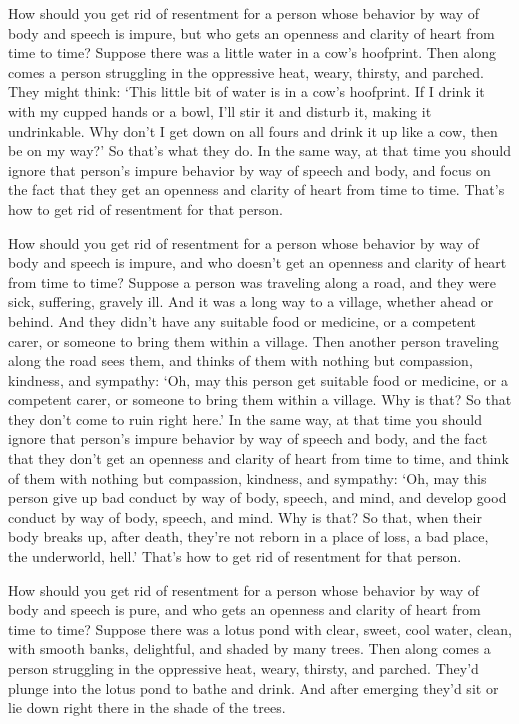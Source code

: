 \documentclass[12pt,openany]{book}%
\begin{document}
How should you get rid of resentment for a person whose behavior by way of body and speech is impure, but who gets an openness and clarity of heart from time to time? Suppose there was a little water in a cow’s hoofprint. Then along comes a person struggling in the oppressive heat, weary, thirsty, and parched. They might think: ‘This little bit of water is in a cow’s hoofprint. If I drink it with my cupped hands or a bowl, I’ll stir it and disturb it, making it undrinkable. Why don’t I get down on all fours and drink it up like a cow, then be on my way?’ So that’s what they do. In the same way, at that time you should ignore that person’s impure behavior by way of speech and body, and focus on the fact that they get an openness and clarity of heart from time to time. That’s how to get rid of resentment for that person. 

How should you get rid of resentment for a person whose behavior by way of body and speech is impure, and who doesn’t get an openness and clarity of heart from time to time? Suppose a person was traveling along a road, and they were sick, suffering, gravely ill. And it was a long way to a village, whether ahead or behind. And they didn’t have any suitable food or medicine, or a competent carer, or someone to bring them within a village. Then another person traveling along the road sees them, and thinks of them with nothing but compassion, kindness, and sympathy: ‘Oh, may this person get suitable food or medicine, or a competent carer, or someone to bring them within a village. Why is that? So that they don’t come to ruin right here.’ In the same way, at that time you should ignore that person’s impure behavior by way of speech and body, and the fact that they don’t get an openness and clarity of heart from time to time, and think of them with nothing but compassion, kindness, and sympathy: ‘Oh, may this person give up bad conduct by way of body, speech, and mind, and develop good conduct by way of body, speech, and mind. Why is that? So that, when their body breaks up, after death, they’re not reborn in a place of loss, a bad place, the underworld, hell.’ That’s how to get rid of resentment for that person. 

How should you get rid of resentment for a person whose behavior by way of body and speech is pure, and who gets an openness and clarity of heart from time to time? Suppose there was a lotus pond with clear, sweet, cool water, clean, with smooth banks, delightful, and shaded by many trees. Then along comes a person struggling in the oppressive heat, weary, thirsty, and parched. They’d plunge into the lotus pond to bathe and drink. And after emerging they’d sit or lie down right there in the shade of the trees. 
\end{document}
